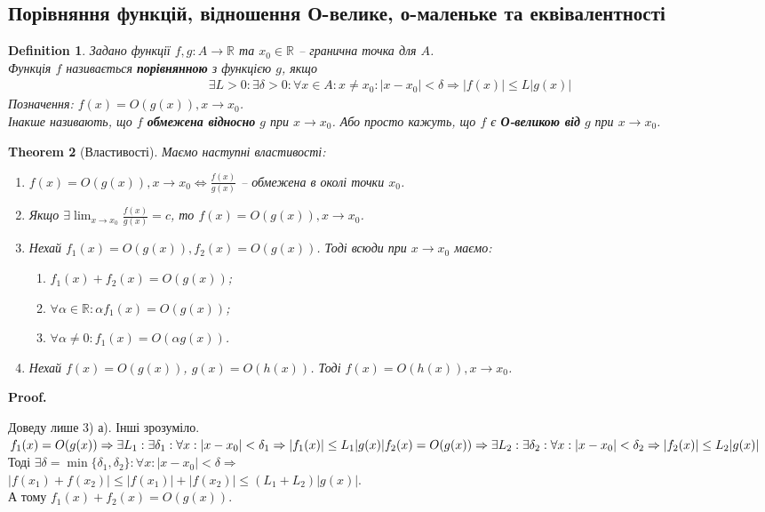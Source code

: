 \documentclass[a4paper, 14pt]{article}
\makeatletter
\def\qed{$\blacksquare$}
\theoremstyle{theoremdd}
\newtheorem{theorem}{Theorem}[subsection]
\theoremstyle{theoremdd}
\newtheorem{definition}[theorem]{Definition}
\theoremstyle{theoremdd}
\theoremstyle{theoremdd}
\theoremstyle{theoremdd}
\theoremstyle{theoremdd}
\theoremstyle{theoremdd}
\theoremstyle{theoremdd}
\renewenvironment{proof}[1][Proof.\\]{\par
\pushQED{\hfill \qed}%
\normalfont \topsep6\p@\@plus6\p@\relax
\trivlist
\item\relax
{\bfseries
#1\@addpunct{.}}\hspace\labelsep\ignorespaces
}{%
\popQED\endtrivlist\@endpefalse
}
\makeatother
\begin{document}
\subsection{Порівняння функцій, відношення О-велике, о-маленьке та еквівалентності}
\begin{definition}
Задано функції $f,g \colon A \to \mathbb{R}$ та $x_0 \in \mathbb{R}$ -- гранична точка для $A$.\\
Функція $f$ називається \textbf{порівнянною} з функцією $g$, якщо
\begin{align*}
\exists L>0: \exists \delta > 0: \forall x \in A: x \neq x_0: |x-x_0| < \delta \Rightarrow |f(x)| \leq L |g(x)|
\end{align*}
Позначення: $f(x) = O(g(x)), x \to x_0$.\\
Інакше називають, що $f$ \textbf{обмежена відносно} $g$ при $x \to x_0$. Або просто кажуть, що $f$ є \textbf{О-великою від} $g$ при $x \to x_0$.
\end{definition}

\begin{theorem}[Властивості]
Маємо наступні властивості:
\begin{enumerate}[nosep,wide=0pt,label={\arabic*)}]
\item $f(x) = O(g(x)), x \to x_0 \iff \displaystyle \frac{f(x)}{g(x)}$ -- обмежена в околі точки $x_0$.
\item Якщо $\exists \displaystyle \lim_{x \to x_0} \frac{f(x)}{g(x)} = c$, то $f(x) = O(g(x)), x \to x_0$.
\item Нехай $f_1(x) = O(g(x)), f_2(x) = O(g(x))$. Тоді всюди при $x \to x_0$ маємо:
\begin{enumerate}[nosep,label={\alph*)}]
\item $f_1(x) + f_2(x) = O(g(x))$;
\item $\forall \alpha \in \mathbb{R}: \alpha f_1(x) = O(g(x))$;
\item $\forall \alpha \neq 0: f_1(x) = O(\alpha g(x))$.
\end{enumerate}
\item Нехай $f(x) = O(g(x))$, $g(x) = O(h(x))$. Тоді $f(x) = O(h(x)), x \to x_0$.
\end{enumerate}
\end{theorem}

\begin{proof}
Доведу лише 3) а). Інші зрозуміло.\\
$f_1(x) = O(g(x)) \Rightarrow \exists L_1: \exists \delta_1: \forall x : |x-x_0| < \delta_1 \Rightarrow |f_1(x)| \leq L_1 |g(x)| \\
f_2(x) = O(g(x)) \Rightarrow \exists L_2: \exists \delta_2: \forall x : |x-x_0| < \delta_2 \Rightarrow |f_2(x)| \leq L_2 |g(x)|$\\
Тоді $\exists \delta = \min\{\delta_1, \delta_2 \}: \forall x: |x-x_0|<\delta \Rightarrow$\\
$|f(x_1)+f(x_2)| \leq |f(x_1)|+|f(x_2)| \leq (L_1+L_2)|g(x)|$.\\
А тому $f_1(x) + f_2(x) = O(g(x))$.
\end{proof}
\end{document}
